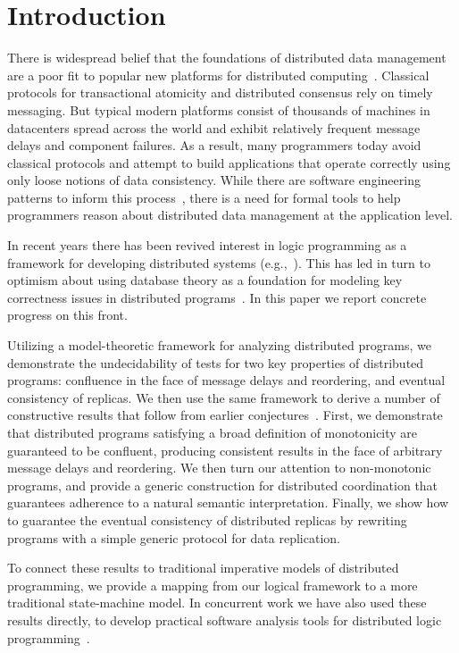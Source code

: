 \section{Introduction}
There is widespread belief that the foundations of distributed data management
are a poor fit to popular new platforms for distributed
computing~\cite{ladis}. Classical protocols for transactional atomicity and
distributed consensus rely on timely messaging. But typical modern platforms
consist of thousands of machines in datacenters spread across the world and
exhibit relatively frequent message delays and component failures.  As a result,
many programmers today avoid classical protocols and attempt to build
applications that operate correctly using only loose notions of data
consistency.  While there are software engineering patterns to inform this
process~\cite{quicksand}, there is a need for formal tools to help programmers
reason about distributed data management at the application level.

In recent years there has been revived interest in logic programming as a framework for developing distributed systems (e.g.,~\cite{reactors,boom}).  This has led in turn to optimism about using database theory as a foundation for modeling key correctness issues in distributed programs~\cite{declarative-imperative}.
In this paper we report concrete progress on this front.  

Utilizing a model-theoretic framework for analyzing distributed programs, we demonstrate the undecidability of tests for two key properties of distributed programs: confluence in the face of message delays and reordering, and eventual consistency of replicas.  We then use the same framework to derive a number of constructive results that follow from earlier conjectures~\cite{declarative-imperative}.
First, we demonstrate that distributed programs satisfying a broad definition of  monotonicity are guaranteed to be confluent, producing consistent results in the face of arbitrary message delays and reordering.  We then turn our attention to non-monotonic programs, and provide a generic construction for distributed coordination that guarantees adherence to a natural semantic interpretation.  Finally, we show how to guarantee the eventual consistency of distributed replicas by rewriting programs with a simple generic protocol for data replication.

To connect these results to traditional imperative models of distributed programming, we provide a mapping from our logical framework to a more traditional state-machine model.  In concurrent work we have also used these results directly, to develop practical software analysis tools for distributed logic programming~\cite{cidr11}.  

